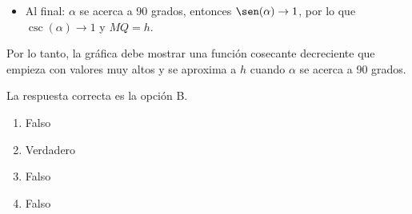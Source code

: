 \documentclass[10pt,a4paper]{article}
\makeatletter
\newenvironment{solution}{\comment}{\endcomment}
\newenvironment{answerlist}{\renewcommand{\labelenumii}{(\alph{enumii})}\begin{enumerate}}{\end{enumerate}}
\newcommand{\exname}[1]{\def\@exname{#1}}
\newcommand{\extype}[1]{\def\@extype{#1}}
\newcommand{\exsolution}[1]{\def\@exsolution{#1}}
\newcommand{\exshuffle}[1]{\def\@exshuffle{#1}}
\newcommand{\exsection}[1]{\def\@exsection{#1}}
\makeatother
\begin{document}
\begin{enumerate}
\begin{solution}
\begin{itemize}
\item Al final: $\alpha$ se acerca a 90 grados, entonces $\sen(\alpha) \to 1$, por lo que $\csc(\alpha) \to 1$ y $MQ = h$.
\end{itemize}

Por lo tanto, la gráfica debe mostrar una función cosecante decreciente que empieza con valores muy altos y se aproxima a $h$ cuando $\alpha$ se acerca a 90 grados.

La respuesta correcta es la opción B.

\begin{answerlist}
  \item Falso
  \item Verdadero
  \item Falso
  \item Falso
\end{answerlist}
\end{solution}

\exname{Trigonometria Punto Movil}
\extype{schoice}
\exsolution{0100}
\exshuffle{TRUE}
\exsection{Geometria Metrica}

\end{enumerate}
\end{document}

